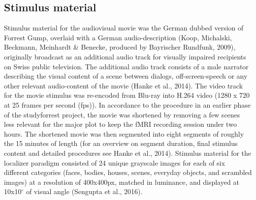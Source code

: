 \documentclass[a4paper, 12pt]{scrreprt}
\begin{document}
\subsection{Stimulus material}

Stimulus material for the audiovisual movie was the German dubbed version of Forrest Gump, overlaid with a German audio-description (Koop, Michalski, Beckmann, Meinhardt \& Benecke, produced by Bayrischer Rundfunk, 2009), originally broadcast as an additional audio track for visually impaired recipients on Swiss public television. The additional audio track consists of a male narrator describing the visual content of a scene between dialogs, off-screen-speech or any other relevant audio-content of the movie (Hanke et al., 2014). The video track for the movie stimulus was re-encoded from Blu-ray into H.264 video (1280 x 720 at 25 frames per second (fps)). In accordance to the procedure in an earlier phase of the studyforrest project, the movie was shortened by removing a few scenes less relevant for the major plot to keep the fMRI recording session under two hours. The shortened movie was then segmented into eight segments of roughly the 15 minutes of length (for an overview on segment duration, final stimulus content and detailed procedures see Hanke et al., 2014). Stimulus material for the localizer paradigm consisted of 24 unique grayscale images for each of six different categories (faces, bodies, houses, scenes, everyday objects, and scrambled images) at a resolution of 400x400px, matched in luminance, and displayed at 10x10$^\circ$ of visual angle (Sengupta et al., 2016).
\end{document}
